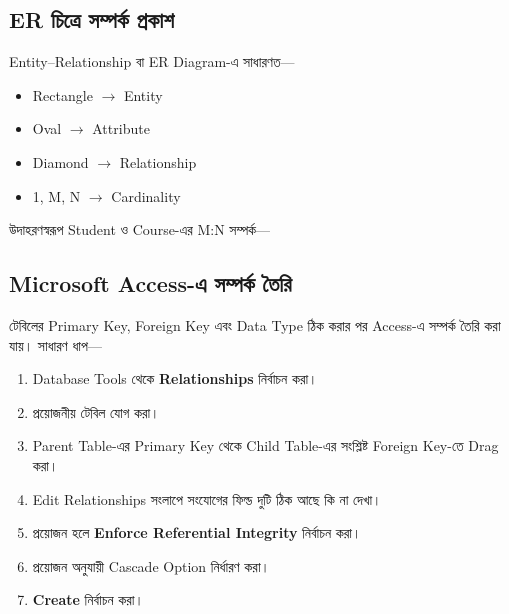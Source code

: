 
\subsection{ER চিত্রে সম্পর্ক প্রকাশ}

Entity--Relationship বা ER Diagram-এ সাধারণত---

\begin{itemize}
    \item Rectangle $\rightarrow$ Entity
    \item Oval $\rightarrow$ Attribute
    \item Diamond $\rightarrow$ Relationship
    \item 1, M, N $\rightarrow$ Cardinality
\end{itemize}


উদাহরণস্বরূপ Student ও Course-এর M:N সম্পর্ক---

\begin{flushleft}

\end{flushleft}



\subsection{Microsoft Access-এ সম্পর্ক তৈরি}

টেবিলের Primary Key, Foreign Key এবং Data Type ঠিক করার পর
Access-এ সম্পর্ক তৈরি করা যায়। সাধারণ ধাপ---

\begin{enumerate}
    \item Database Tools থেকে \textbf{Relationships} নির্বাচন করা।
    \item প্রয়োজনীয় টেবিল যোগ করা।
    \item Parent Table-এর Primary Key থেকে Child Table-এর সংশ্লিষ্ট
          Foreign Key-তে Drag করা।
    \item Edit Relationships সংলাপে সংযোগের ফিল্ড দুটি ঠিক আছে কি না দেখা।
    \item প্রয়োজন হলে \textbf{Enforce Referential Integrity} নির্বাচন করা।
    \item প্রয়োজন অনুযায়ী Cascade Option নির্ধারণ করা।
    \item \textbf{Create} নির্বাচন করা।
\end{enumerate}


